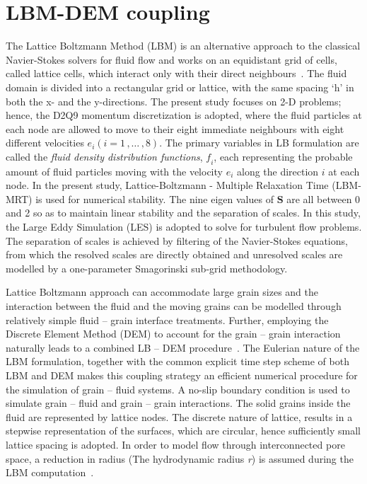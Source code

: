 \documentclass[epj,twocolumn]{webofc}
\begin{document}
\section{LBM-DEM coupling}
The Lattice Boltzmann Method (LBM) is an alternative approach to
the classical Navier-Stokes solvers for fluid flow and works on an
equidistant grid of cells, called lattice cells, which interact only with
their direct neighbours~\cite{He1997}. The fluid domain is divided into
a rectangular grid or lattice, with the same spacing ‘h’ in both the x-
and the y-directions. The present study focuses on 2-D problems; hence,
the D2Q9 momentum discretization is adopted, where the fluid particles at
each node are allowed to move to their eight immediate neighbours
with eight different velocities $\mathit{e_i} (\mathit{i}=1\,,\dots\,,8)$.
The primary variables in LB formulation are called the \textit{fluid 
density distribution functions}, $\mathit{f_i}$, each representing the probable 
amount of fluid particles moving with the velocity $\mathit{e_i}$ along the 
direction $\mathit{i}$ at each node. In the present study, Lattice-Boltzmann
- Multiple Relaxation Time (LBM-MRT) is used for numerical stability.
The nine eigen values of $\mathbf{S}$ are all between 0 and 2 so as to
maintain linear stability and the separation of scales. In  this  study,
the Large Eddy Simulation (LES) is adopted to solve for turbulent flow
problems. The separation of scales is achieved by filtering of the
Navier-Stokes equations, from which the resolved scales are directly
obtained and unresolved scales are modelled by a one-parameter
Smagorinski sub-grid methodology.%

Lattice Boltzmann approach can accommodate large grain sizes and the
interaction between the fluid and the moving grains can be modelled
through relatively simple fluid – grain interface treatments. Further,
employing the Discrete Element Method (DEM) to account for the
grain – grain interaction naturally leads to a combined LB – DEM
procedure~\cite{Kumar2012}. The Eulerian nature of the LBM formulation,
together with the common explicit time step scheme of both LBM and DEM
makes this coupling strategy an efficient numerical procedure for the
simulation of grain – fluid systems. A no-slip boundary condition is
used to simulate grain – fluid and grain – grain interactions. The
solid grains inside the fluid are represented by lattice
nodes. The discrete nature of lattice, results in a stepwise
representation of the surfaces, which are circular, hence
sufficiently small lattice spacing is adopted. In order to model flow
through interconnected pore space, a reduction in radius (The
hydrodynamic radius \textit{r}) is assumed during the
LBM computation~\citep{soundararajan2015}.
\end{document}
